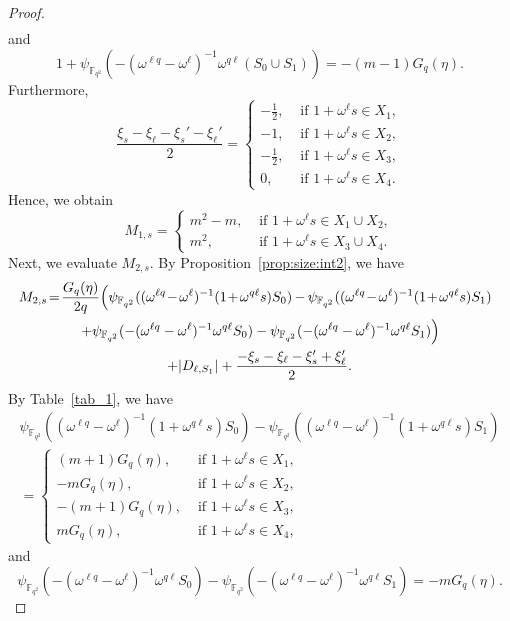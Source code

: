 \documentclass[ALCO,ThmDefs,Unicode]{cedram}
\newcommand*\F{{\mathbb F}}
\newcommand*{\mk}{\mkern -1mu}
\newcommand*{\Mk}{\mkern -2mu}
\begin{document}
\begin{proof}
\begin{align*}
\end{align*}
and
\[
1+\psi_{\F_{q^2}}(-(\omega^{\ell q}-\omega^\ell)^{-1}\omega^{q\ell}(S_0\cup S_1))=-(m-1)G_q(\eta).
\]
Furthermore,
\[
\frac{\xi_s-\xi_{\ell}-\xi_s'-\xi_{\ell}'}{2}=
\begin{cases}
-\frac{1}{2},& \text{ if } 1+\omega^{\ell} s\in X_1,\\
-1,& \text{ if } 1+\omega^{\ell} s\in X_2, \\
-\frac{1}{2},& \text{ if }1+\omega^{\ell} s\in X_3,\\
0,& \text{ if } 1+\omega^{\ell} s\in X_4.
\end{cases}
\]
Hence, we obtain
\[
M_{1,s}=
\begin{cases}
m^2-m,& \text{ if } 1+\omega^\ell s\in X_1 \cup X_2,\\
m^2,& \text{ if } 1+\omega^\ell s\in X_3 \cup X_4.
\end{cases}
\]
Next, we evaluate $M_{2,s}$. By Proposition~\ref{prop:size:int2}, we have
\begin{multline}
\!\!\!M_{2,s}\!=\!\frac{G_q(\eta)}{2q}\!\left(\psi_{\F_{q^2}}((\omega^{\ell q}\!-\Mk\omega^\ell)^{-1}(1\!+\Mk\omega^{q\ell} s)S_0)\mk-\mk\psi_{\F_{q^2}}((\omega^{\ell q}\!-\Mk\omega^\ell)^{-1}(1\!+\Mk\omega^{q\ell} s)S_1)\right.\\
\left.+\psi_{\F_{q^2}}(-(\omega^{\ell q}-\omega^\ell)^{-1}\omega^{q\ell}S_0)-\psi_{\F_{q^2}}(-(\omega^{\ell q}-\omega^\ell)^{-1}\omega^{q\ell}S_1)\right)\\
+|D_{\ell,S_1}|+\frac{-\xi_s-\xi_{\ell}-\xi_s'+\xi_{\ell}'}{2}.\label{eq:com14R2}
\end{multline}
By Table~\ref{tab_1}, we have
\begin{multline*}
\psi_{\F_{q^2}}((\omega^{\ell q}-\omega^\ell)^{-1}(1+\omega^{q\ell} s)S_0)-\psi_{\F_{q^2}}((\omega^{\ell q}-\omega^\ell)^{-1}(1+\omega^{q\ell} s)S_1)\\
=\begin{cases}
(m+1)G_{q}(\eta),& \text{ if } 1+\omega^{\ell} s\in X_1,\\
-m G_{q}(\eta),& \text{ if } 1+\omega^{\ell} s\in X_2, \\
-(m+1) G_{q}(\eta),& \text{ if }1+\omega^{\ell} s\in X_3,\\
m G_{q}(\eta),& \text{ if } 1+\omega^{\ell} s\in X_4,
\end{cases}
\end{multline*}
and
\[
\psi_{\F_{q^2}}(-(\omega^{\ell q}-\omega^\ell)^{-1}\omega^{q\ell}S_0)-\psi_{\F_{q^2}}(-(\omega^{\ell q}-\omega^\ell)^{-1}\omega^{q\ell}S_1)=-mG_q(\eta).
\]
\end{proof}
\end{document}
